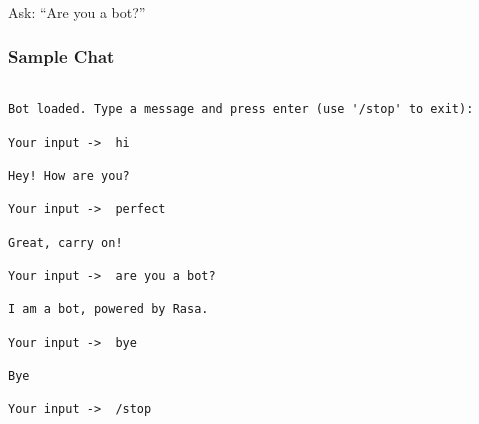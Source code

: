 \begin{frame}[fragile]\frametitle{}
\begin{center}
{\Large Ask: ``Are you a bot?''}
\end{center}
\end{frame}

\begin{frame}[fragile]\frametitle{Sample Chat}
\begin{lstlisting}

Bot loaded. Type a message and press enter (use '/stop' to exit):

Your input ->  hi

Hey! How are you?

Your input ->  perfect

Great, carry on!

Your input ->  are you a bot?

I am a bot, powered by Rasa.

Your input ->  bye

Bye

Your input ->  /stop

\end{lstlisting}
\end{frame}




